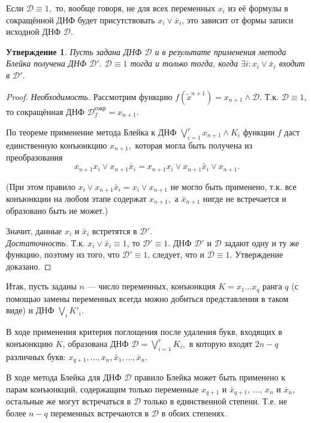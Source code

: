 \documentclass[12pt,a4paper,oneside,fleqn,leqno]{article}
\newtheorem{statement}{Утверждение}
\theoremstyle{definition}
\begin{document}
		Если $\mathcal{D} \equiv 1,$ то, вообще говоря, не для всех переменных $x_i$ из её формулы в сокращённой ДНФ будет присутствовать $x_i \vee \bar{x}_i$, это зависит от формы записи исходной ДНФ $\mathcal{D}.$\par
		\begin{statement}
			Пусть задана ДНФ $\mathcal{D}$ и в результате применения метода Блейка получена ДНФ $\mathcal{D}'.$ $\mathcal{D} \equiv 1$ тогда и только тогда, когда $\exists i: x_i \vee \bar{x}_i$ входит в $\mathcal{D}'.$
		\end{statement}
		\begin{proof}
			\textit{Необходимость.} Рассмотрим функцию $f(\tilde x^{n+1}) = x_{n + 1} \wedge \mathcal{D}.$ Т.к. $\mathcal{D} \equiv 1,$ то сокращённая ДНФ $\mathcal{D}_f^{\text{сокр}} = x_{n + 1}.$\par
			По теореме применение метода Блейка к ДНФ $\bigvee\limits_{i = 1}^r x_{n + 1} \wedge K_i$ функции $f$ даст единственную конъюнкцию $x_{n + 1},$ которая могла быть получена из преобразования
			$$
				x_{n + 1} x_i \vee x_{n + 1} \bar{x}_i = x_{n + 1} x_i \vee x_{n + 1} \bar{x}_i \vee x_{n + 1}.
			$$\par
			(При этом правило $x_i \vee x_{n + 1} \bar{x}_i = x_i \vee x_{n + 1}$ не могло быть применено, т.к. все конъюнкции на любом этапе содержат $x_{n + 1},$ а $\bar{x}_{n + 1}$ нигде не встречается и образовано быть не может.)\par
			Значит, данные $x_i$ и $\bar{x}_i$ встретятся в $\mathcal{D}'.$\\
		\textit{Достаточность.} Т.к. $x_i \vee \bar{x}_i \equiv 1$, то $\mathcal{D}' \equiv 1$. ДНФ $\mathcal{D}'$ и $\mathcal{D}$ задают одну и ту же функцию, поэтому из того, что $\mathcal{D}' \equiv 1$, следует, что и $\mathcal{D} \equiv 1.$ Утверждение доказано.
		\end{proof}\par
		Итак, пусть заданы $n$ --- число переменных, конъюнкция $K = x_1\ldots x_q$ ранга $q$ (с помощью замены переменных всегда можно добиться представления в таком виде) и ДНФ $\bigvee\limits_iK'_i.$\par
		В ходе применения критерия поглощения после удаления букв, входящих в конъюнкцию $K$, образована ДНФ $\mathcal{D} = \bigvee\limits_{i = 1}^rK_i,$ в которую входят $2n - q$ различных букв: $x_{q + 1},\ldots, x_n, \bar{x}_1,\ldots,\bar{x}_n$.\par
		В ходе метода Блейка для ДНФ $\mathcal{D}$ правило Блейка может быть применено к парам конъюнкций, содержащим только переменные $x_{q+1}$ и $\bar{x}_{q+1}$, $\ldots$, $x_{n}$ и $\bar{x}_{n},$ остальные же могут встречаться в $\mathcal{D}$ только в единственной степени. Т.е. не более $n - q$ переменных встречаются в $\mathcal{D}$ в обоих степенях.\par
\end{document}
